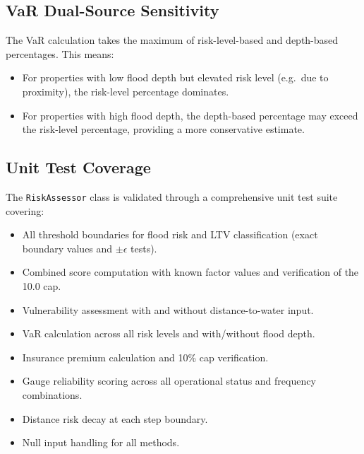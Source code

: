 \documentclass[11pt,a4paper]{article}
\begin{document}
\subsection{VaR Dual-Source Sensitivity}

The VaR calculation takes the maximum of risk-level-based and depth-based percentages. This means:

\begin{itemize}
    \item For properties with low flood depth but elevated risk level (e.g.\ due to proximity), the risk-level percentage dominates.
    \item For properties with high flood depth, the depth-based percentage may exceed the risk-level percentage, providing a more conservative estimate.
\end{itemize}

\clearpage

\mkmvalidation

\subsection{Unit Test Coverage}

The \texttt{RiskAssessor} class is validated through a comprehensive unit test suite covering:

\begin{itemize}
    \item All threshold boundaries for flood risk and LTV classification (exact boundary values and $\pm\epsilon$ tests).
    \item Combined score computation with known factor values and verification of the 10.0 cap.
    \item Vulnerability assessment with and without distance-to-water input.
    \item VaR calculation across all risk levels and with/without flood depth.
    \item Insurance premium calculation and 10\% cap verification.
    \item Gauge reliability scoring across all operational status and frequency combinations.
    \item Distance risk decay at each step boundary.
    \item Null input handling for all methods.
\end{itemize}
\end{document}
